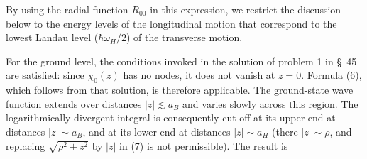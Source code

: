 By using the radial function $R_{00}$ in this expression, we restrict the discussion below to the energy levels of the longitudinal motion that correspond to the lowest Landau level ($\hbar\omega_H/2$) of the transverse motion.

For the ground level, the conditions invoked in the solution of problem 1 in \S~45 are satisfied: since $\chi_0(z)$ has no nodes, it does not vanish at $z=0$. Formula (6), which follows from that solution, is therefore applicable. The ground-state wave function extends over distances $|z|\lesssim a_B$ and varies slowly across this region. The logarithmically divergent integral is consequently cut off at its upper end at distances $|z|\sim a_B$, and at its lower end at distances $|z|\sim a_H$ (there $|z|\sim\rho$, and replacing $\sqrt{\rho^2+z^2}$ by $|z|$ in (7) is not
permissible). The result is
